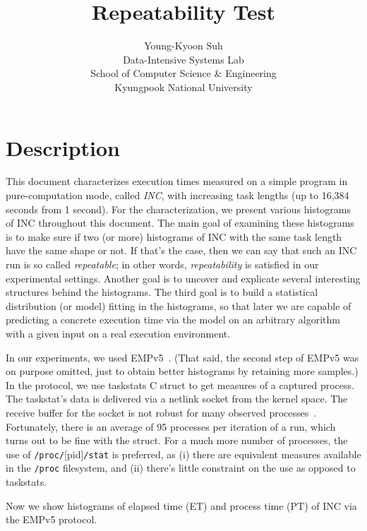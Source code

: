 \documentclass[10pt]{article}
\begin{document}
\title{Repeatability Test}

\author{
Young-Kyoon Suh\\ 
Data-Intensive Systems Lab \\
School of Computer Science \& Engineering\\
Kyungpook National University
}
\maketitle

\section{Description}
This document characterizes execution times 
measured on a simple program in pure-computation mode, called {\em INC}, 
with increasing task lengths (up to 16,384 seconds from 1 second). 
For the characterization, we present various histograms of INC throughout this document.
The main goal of examining these histograms is to make sure if 
two (or more) histograms of INC with the same task length 
have the same shape or not. If that's the case, then we can say that such an INC run is so called {\em repeatable}; 
in other words, {\em repeatability} is satisfied in our experimental settings. 
Another goal is to uncover and explicate several interesting structures behind the histograms. 
The third goal is to build a statistical distribution (or model) fitting in the histograms, so that later we 
are capable of predicting a concrete execution time via 
the model on an arbitrary algorithm with a given input on a real execution environment.

In our experiments, we used EMPv5~\cite{EMP}. 
(That said, the second step of EMPv5 was on purpose omitted, just to obtain better histograms by retaining more samples.) 
In the protocol, we use taskstats C struct to get measures of a captured process. 
The taskstat's data is delivered via a netlink socket from the kernel space. 
The receive buffer for the socket is not robust for many observed processes~\cite{Metrology}. 
Fortunately, there is an average of 95 processes per iteration of a run, 
which turns out to be fine with the struct. 
For a much more number of processes, 
the use of  {\tt /proc/}[pid]{\tt{/stat}} is preferred, 
as (i) there are equivalent measures available in the {\tt /proc} filesystem, 
and (ii) there's little constraint on the use as opposed to taskstats. 

Now we show histograms of elapsed time (ET) and process time (PT) of INC via the EMPv5 protocol.
\end{document}
